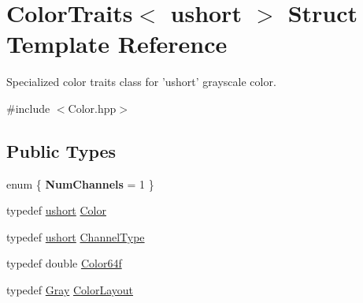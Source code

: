 \hypertarget{struct_d_o_1_1_color_traits_3_01ushort_01_4}{\section{Color\-Traits$<$ ushort $>$ Struct Template Reference}
\label{struct_d_o_1_1_color_traits_3_01ushort_01_4}
}


Specialized color traits class for 'ushort' grayscale color.  




{\ttfamily \#include $<$Color.\-hpp$>$}

\subsection*{Public Types}
\begin{DoxyCompactItemize}
\item 
enum \{ {\bfseries Num\-Channels} = 1
 \}
\item 
typedef \hyperlink{group___eigen_typedefs_gab95f123a6c9bcfee6a343170ef8c5f69}{ushort} \hyperlink{struct_d_o_1_1_color_traits_3_01ushort_01_4_a1ef69be3e9e9a4da299f5111fc591a79}{Color}
\item 
typedef \hyperlink{group___eigen_typedefs_gab95f123a6c9bcfee6a343170ef8c5f69}{ushort} \hyperlink{struct_d_o_1_1_color_traits_3_01ushort_01_4_a99998126b2448d8950e0509f25ebc9ed}{Channel\-Type}
\item 
typedef double \hyperlink{struct_d_o_1_1_color_traits_3_01ushort_01_4_a9a301fd8ba0a7225e38351d3e5b2e4d3}{Color64f}
\item 
typedef \hyperlink{struct_d_o_1_1_gray}{Gray} \hyperlink{struct_d_o_1_1_color_traits_3_01ushort_01_4_a7c9d599cfa0d1404784fbe60e6bcfd24}{Color\-Layout}
\end{DoxyCompactItemize}
